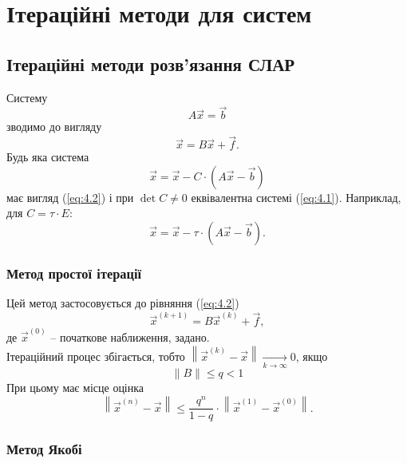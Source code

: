 \section{Ітераційні методи для систем}

\subsection{Ітераційні методи розв'язання СЛАР}

Систему
\begin{equation}
	\label{eq:4.1}
	A \vec x = \vec b
\end{equation}
зводимо до вигляду
\begin{equation}
	\label{eq:4.2}
	\vec x = B \vec x + \vec f.
\end{equation}
Будь яка система
\begin{equation}
	\label{eq:4.3}
	\vec x = \vec x - C \cdot (A \vec x - \vec b)
\end{equation}
має вигляд (\ref{eq:4.2}) і при $\det C \ne 0$ еквівалентна системі (\ref{eq:4.1}). Наприклад, для $C = \tau \cdot E$:
\begin{equation}
	\label{eq:4.4}
	\vec x = \vec x - \tau \cdot (A \vec x - \vec b).
\end{equation}


\subsubsection{Метод простої ітерації}

Цей метод застосовується до рівняння (\ref{eq:4.2})
\begin{equation}
	\label{eq:4.5}
	\vec x^{(k+1)} = B \vec x^{(k)} + \vec f,
\end{equation}
де $\vec x^{(0)}$ -- початкове наближення, задано.\\

Ітераційний процес збігається, тобто $\left\| \vec x^{(k)} - \vec x\right\| \xrightarrow[k\to\infty]{} 0$, якщо
\begin{equation}
	\label{eq:4.6}
	\|B\| \le q < 1
\end{equation}
При цьому має місце оцінка
\begin{equation}
	\label{eq:4.7}
	\left\|\vec x^{(n)} - \vec x\right\| \le \dfrac{q^n}{1-q}\cdot\left\|\vec x^{(1)} - \vec x^{(0)}\right\|.
\end{equation}

\subsubsection{Метод Якобі}

